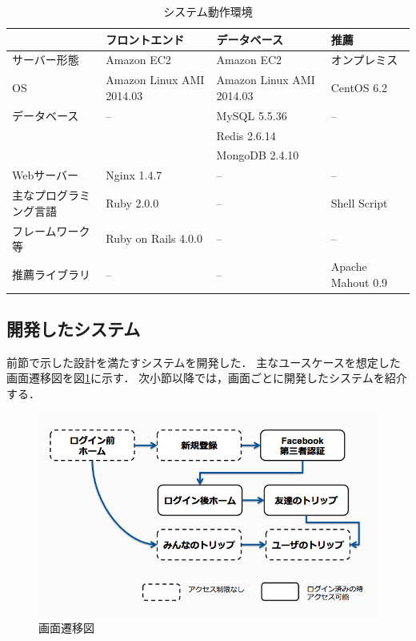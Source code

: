 \documentclass{jsarticle}
\begin{document}
\begin{table}[!h]
\small
\caption{システム動作環境}
\begin{center}
\begin{tabular}{l|l|l|l}
\label{operation}
                & フロントエンド & データベース & 推薦 \\ \hline
サーバー形態    & Amazon EC2 & Amazon EC2 & オンプレミス \\
OS              & Amazon Linux AMI 2014.03 & Amazon Linux AMI 2014.03 & CentOS 6.2 \\
データベース    & --        & MySQL 5.5.36 & -- \\ 
                &           & Redis 2.6.14 &    \\
                &           & MongoDB 2.4.10 &  \\
Webサーバー     & Nginx 1.4.7 &  -- & -- \\
主なプログラミング言語  & Ruby 2.0.0 &  -- & Shell Script \\
フレームワーク等  & Ruby on Rails 4.0.0 & -- & -- \\
推薦ライブラリ  & -- &  -- & Apache Mahout 0.9 \\
\end{tabular}
\end{center}
\end{table}

\subsection{開発したシステム}

前節で示した設計を満たすシステムを開発した．
主なユースケースを想定した画面遷移図を図\ref{flow_screen}に示す．
次小節以降では，画面ごとに開発したシステムを紹介する．

\begin{figure}[!ht]
\begin{center}
\includegraphics[width=12.0cm]{./image/cheekitrip_flow_screen.png}
\caption{画面遷移図}
\label{flow_screen}
\end{center}
\end{figure}
\end{document}
